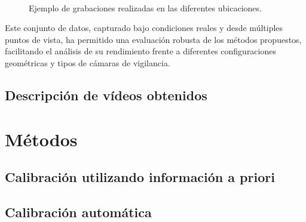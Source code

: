 \begin{figure}[htp]
\begin{center}
    \\
\end{center}
\caption{Ejemplo de grabaciones realizadas en las diferentes ubicaciones.}
\label{fig:DataExamples}
\end{figure}

Este conjunto de datos, capturado bajo condiciones reales y desde múltiples puntos de vista, ha permitido una evaluación robusta de
los métodos propuestos, facilitando el análisis de su rendimiento frente a diferentes configuraciones geométricas y
tipos de cámaras de vigilancia.
\subsection{Descripción de vídeos obtenidos}
\section{Métodos}
\subsection{Calibración utilizando información a priori}
\subsection{Calibración automática}
